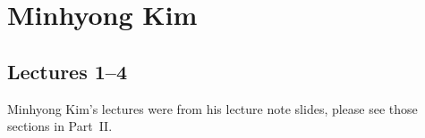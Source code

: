 \newpage
\section{Minhyong Kim}
\subsection{Lectures 1--4}

Minhyong Kim's lectures were from his lecture note slides, please see those sections in Part~II. 